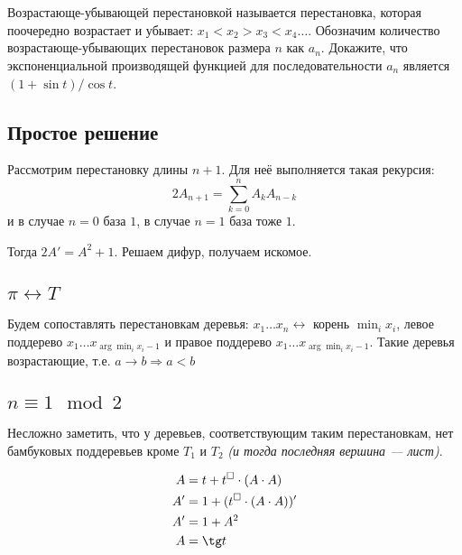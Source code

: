 



\setcounter{section}{111}

\section{}
Возрастающе-убывающей перестановкой называется перестановка, которая поочередно возрастает и убывает: $x_1 < x_2 > x_3 < x_4 \ldots$. Обозначим количество возрастающе-убывающих перестановок размера $n$ как $a_n$. Докажите, что экспоненциальной производящей функцией для последовательности $a_n$ является $(1+\sin t)/\cos t$.

\subsection{Простое решение}

Рассмотрим перестановку длины \(n + 1\). Для неё выполняется такая рекурсия:
\[2 A_{n+1} = \sum_{k = 0}^n A_k A_{n - k}\]
и в случае \(n = 0\) база \(1\), в случае \(n = 1\) база тоже \(1\).

Тогда \(2 A' = A^2 + 1\). Решаем дифур, получаем искомое.

\subsection{\(\pi \leftrightarrow T\)}

Будем сопоставлять перестановкам деревья: \(x_1 \dots x_n \leftrightarrow\) корень \(\min_i x_i\), левое поддерево \(x_1 \dots x_{\arg\min_i x_i - 1}\) и правое поддерево \(x_1 \dots x_{\arg\min_i x_i - 1}\). Такие деревья возрастающие, т.е. \(a \to b \Rightarrow a < b\)

\subsection{\(n \equiv 1 \mod 2\)}

Несложно заметить, что у деревьев, соответствующим таким перестановкам, нет бамбуковых поддеревьев кроме \(T_1\) и \(T_2\) \textit{(и тогда последняя вершина --- лист)}.

\begin{align}
    A  & = t + t^{\square} \cdot (A \cdot A)    \\
    A' & = 1 + (t^{\square} \cdot (A \cdot A))' \\
    A' & = 1 + A^2                              \\
    A  & = \tg t                                \\
\end{align}

